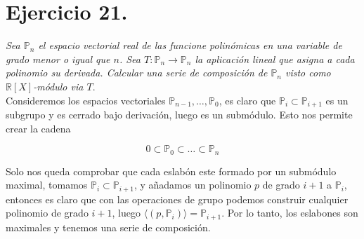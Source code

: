 \section{Ejercicio 21. } \textit{Sea \(\mathbb{P}_n\) el espacio vectorial real
  de las funcione polinómicas en una variable de grado menor o igual que \(n\).
  Sea \(T: \mathbb{P}_n \to \mathbb{P}_n\) la aplicación lineal que asigna a
  cada polinomio su derivada. Calcular una serie de composición de
  \(\mathbb{P}_n\) visto como \(\mathbb{R}[X]\)-módulo via \(T\)}.\\

Consideremos los espacios vectoriales \(\mathbb{P}_{n-1},\dots,\mathbb{P}_0\),
es claro que \(\mathbb{P}_i \subset \mathbb{P}_{i+1}\) es un subgrupo y es
cerrado bajo derivación, luego es un submódulo. Esto nos permite crear la cadena

\[
  0 \subset \mathbb{P}_0 \subset \dots \subset \mathbb{P}_n
\]

Solo nos queda comprobar que cada eslabón este formado por un submódulo maximal,
tomamos \(\mathbb{P}_i \subset \mathbb{P}_{i+1}\),  y añadamos un polinomio \(p\) de
grado \(i+1\) a \(\mathbb{P}_i \), entonces es claro que con las operaciones de
grupo podemos construir cualquier polinomio de grado \(i+1\), luego \(\langle
(p, \mathbb{P}_i) \rangle = \mathbb{P}_{i+1}\). Por lo tanto, los eslabones son
maximales y tenemos una serie de composición.
